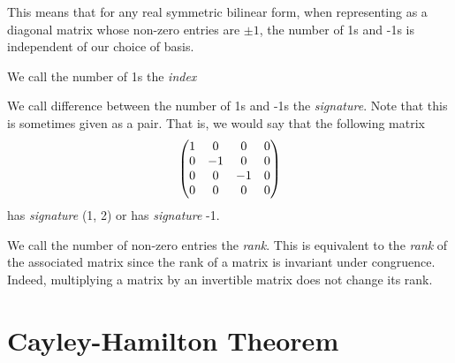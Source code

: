 \begin{remark}
  This means that for any real symmetric bilinear form, when representing as a diagonal matrix whose non-zero entries are $\pm 1$,
  the number of 1s and -1s is independent of our choice of basis.
\end{remark}

\begin{definition}[Index]
  We call the number of 1s the \emph{index}
\end{definition}

\begin{definition}[Signature]
  We call difference between the number of 1s and -1s the \emph{signature}.
  Note that this is sometimes given as a pair. That is, we would say that the following matrix
  \begin{align}
    \begin{pmatrix}
      1 & 0 & 0 & 0 \\
      0 & -1 & 0 & 0 \\
      0 & 0 & -1 & 0 \\
      0 & 0 & 0 & 0
    \end{pmatrix}
  \end{align}
  has \emph{signature} (1, 2) or has \emph{signature} -1.
\end{definition}

\begin{definition}[Rank]
  We call the number of non-zero entries the \emph{rank}.
  This is equivalent to the \emph{rank} of the associated matrix since the rank of a matrix is invariant under congruence.
  Indeed, multiplying a matrix by an invertible matrix does not change its rank.
\end{definition}

\section{Cayley-Hamilton Theorem}

